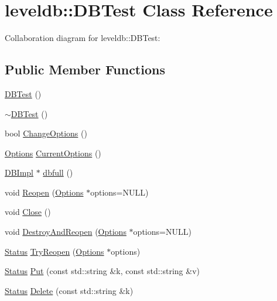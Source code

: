\hypertarget{classleveldb_1_1_d_b_test}{}\section{leveldb\+:\+:D\+B\+Test Class Reference}
\label{classleveldb_1_1_d_b_test}


Collaboration diagram for leveldb\+:\+:D\+B\+Test\+:
\subsection*{Public Member Functions}
\begin{DoxyCompactItemize}
\item 
\hyperlink{classleveldb_1_1_d_b_test_afc6fc9512e900de6ee10c5db15b22930}{D\+B\+Test} ()
\item 
\hyperlink{classleveldb_1_1_d_b_test_a2268045d59c3a74bba03877819e36b55}{$\sim$\+D\+B\+Test} ()
\item 
bool \hyperlink{classleveldb_1_1_d_b_test_a587534fe403016f15cf1997ef7a40836}{Change\+Options} ()
\item 
\hyperlink{structleveldb_1_1_options}{Options} \hyperlink{classleveldb_1_1_d_b_test_a68db410e16195a3b67822bec05c06547}{Current\+Options} ()
\item 
\hyperlink{classleveldb_1_1_d_b_impl}{D\+B\+Impl} $\ast$ \hyperlink{classleveldb_1_1_d_b_test_a67de35d247ea077c1e4fdf2a7a0f0514}{dbfull} ()
\item 
void \hyperlink{classleveldb_1_1_d_b_test_a38170a082cbc71fb446408ff5634c797}{Reopen} (\hyperlink{structleveldb_1_1_options}{Options} $\ast$options=N\+U\+L\+L)
\item 
void \hyperlink{classleveldb_1_1_d_b_test_aee76446bbb9c34cdb1ae00318689aead}{Close} ()
\item 
void \hyperlink{classleveldb_1_1_d_b_test_ab798a43e7feab6dddc8fa1eb7a5f61f6}{Destroy\+And\+Reopen} (\hyperlink{structleveldb_1_1_options}{Options} $\ast$options=N\+U\+L\+L)
\item 
\hyperlink{classleveldb_1_1_status}{Status} \hyperlink{classleveldb_1_1_d_b_test_aee588b2d13db6be2a651a8fabeac5c79}{Try\+Reopen} (\hyperlink{structleveldb_1_1_options}{Options} $\ast$options)
\item 
\hyperlink{classleveldb_1_1_status}{Status} \hyperlink{classleveldb_1_1_d_b_test_a5ec1a1d5ecc1744f325159eb81e46514}{Put} (const std\+::string \&k, const std\+::string \&v)
\item 
\hyperlink{classleveldb_1_1_status}{Status} \hyperlink{classleveldb_1_1_d_b_test_a25716ec93d525adbeea8ff71e8f3a9f4}{Delete} (const std\+::string \&k)

\end{DoxyCompactItemize}
